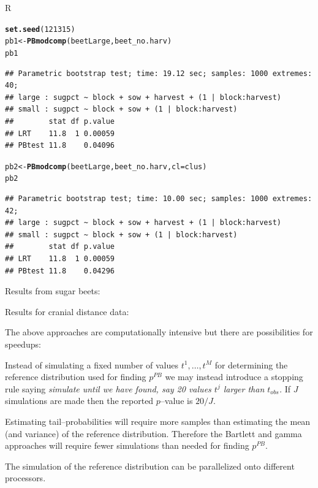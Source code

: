 \documentclass[compress]{beamer}\usepackage[]{graphicx}\usepackage[]{color}
\makeatletter
\newcommand{\hlnum}[1]{\textcolor[rgb]{0.686,0.059,0.569}{#1}}%
\newcommand{\hlstd}[1]{\textcolor[rgb]{0.345,0.345,0.345}{#1}}%
\newcommand{\hlkwb}[1]{\textcolor[rgb]{0.69,0.353,0.396}{#1}}%
\newcommand{\hlkwc}[1]{\textcolor[rgb]{0.333,0.667,0.333}{#1}}%
\newcommand{\hlkwd}[1]{\textcolor[rgb]{0.737,0.353,0.396}{\textbf{#1}}}%
\newenvironment{kframe}{%
 \def\at@end@of@kframe{}%
 \ifinner\ifhmode%
  \def\at@end@of@kframe{\end{minipage}}%
  \begin{minipage}{\columnwidth}%
 \fi\fi%
 \def\FrameCommand##1{\hskip\@totalleftmargin \hskip-\fboxsep
 \colorbox{shadecolor}{##1}\hskip-\fboxsep
     \hskip-\linewidth \hskip-\@totalleftmargin \hskip\columnwidth}%
 \MakeFramed {\advance\hsize-\width
   \@totalleftmargin\z@ \linewidth\hsize
   \@setminipage}}%
 {\par\unskip\endMakeFramed%
 \at@end@of@kframe}
\newenvironment{knitrout}{}{} %
\newenvironment{sframe}
{\begin{frame} [containsverbatim] }
  {\end{frame}}
\newenvironment{sblock}
{\begin{block}{R}}
  {\end{block}}
\makeatother
\begin{document}
\begin{sframe}
\begin{sblock}
\begin{knitrout}\tiny
{}\color{fgcolor}\begin{kframe}
\begin{alltt}
\hlkwd{set.seed}\hlstd{(}\hlnum{121315}\hlstd{)}
\hlstd{pb1} \hlkwb{<-} \hlkwd{PBmodcomp}\hlstd{(beetLarge, beet_no.harv)}
\hlstd{pb1}
\end{alltt}
\begin{verbatim}
## Parametric bootstrap test; time: 19.12 sec; samples: 1000 extremes: 40;
## large : sugpct ~ block + sow + harvest + (1 | block:harvest)
## small : sugpct ~ block + sow + (1 | block:harvest)
##        stat df p.value
## LRT    11.8  1 0.00059
## PBtest 11.8    0.04096
\end{verbatim}
\begin{alltt}
\hlstd{pb2} \hlkwb{<-} \hlkwd{PBmodcomp}\hlstd{(beetLarge, beet_no.harv,} \hlkwc{cl}\hlstd{=clus)}
\hlstd{pb2}
\end{alltt}
\begin{verbatim}
## Parametric bootstrap test; time: 10.00 sec; samples: 1000 extremes: 42;
## large : sugpct ~ block + sow + harvest + (1 | block:harvest)
## small : sugpct ~ block + sow + (1 | block:harvest)
##        stat df p.value
## LRT    11.8  1 0.00059
## PBtest 11.8    0.04296
\end{verbatim}
\end{kframe}
\end{knitrout}
\end{sblock}  
\end{sframe}



\begin{sframe}
Results from sugar beets:


Results for cranial distance data:

\end{sframe}


\begin{sframe}

  The above approaches are computationally intensive but there are
  possibilities for speedups:

  Instead of simulating a fixed number of values $t^1, \dots, t^M$ for
  determining the reference distribution used for finding $p^{PB}$
  we may instead introduce a stopping rule saying \emph{simulate until we
  have found, say 20 values $t^j$ larger than $t_{obs}$.} If $J$
  simulations are made then the reported $p$--value is $20/J$.

  Estimating tail--probabilities will require more samples than
  estimating the mean (and variance) of the reference
  distribution. Therefore the Bartlett and gamma approaches will
  require fewer simulations than needed for finding $p^{PB}$.

  The simulation of the reference distribution can be parallelized
  onto different processors.

\end{sframe}
\end{document}
